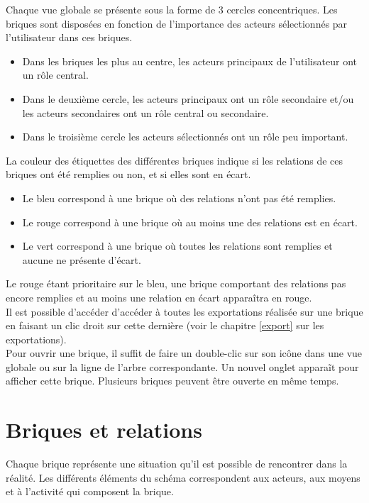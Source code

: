 Chaque vue globale se présente sous la forme de 3 cercles concentriques. Les briques sont disposées en fonction de l'importance des acteurs sélectionnés par l'utilisateur dans ces briques.
\begin{itemize}
\item Dans les briques les plus au centre, les acteurs principaux de l'utilisateur ont un rôle central.
\item Dans le deuxième cercle, les acteurs principaux ont un rôle secondaire et/ou les acteurs secondaires ont un rôle central ou secondaire.
\item Dans le troisième cercle les acteurs sélectionnés ont un rôle peu important.\\
\end{itemize}

La couleur des étiquettes des différentes briques indique si les relations de ces briques ont été remplies ou non, et si elles sont en écart. 
\begin{itemize}
\item Le bleu correspond à une brique où des relations n'ont pas été remplies.
\item Le rouge correspond à une brique où au moins une des relations est en écart.
\item Le vert correspond à une brique où toutes les relations sont remplies et aucune ne présente d'écart.
\end{itemize}

Le rouge étant prioritaire sur le bleu, une brique comportant des relations pas encore remplies et au moins une relation en écart apparaîtra en rouge.\\

Il est possible d'accéder d'accéder à toutes les exportations réalisée sur une brique en faisant un clic droit sur cette dernière (voir le chapitre \ref{export} sur les exportations).\\

Pour ouvrir une brique, il suffit de faire un double-clic sur son icône dans une vue globale ou sur la ligne de l'arbre correspondante. Un nouvel onglet apparaĩt  pour afficher cette brique. Plusieurs briques peuvent être ouverte en même temps. 

\section{Briques et relations}
Chaque brique représente une situation qu'il est possible de rencontrer dans la réalité. Les différents éléments du schéma correspondent aux acteurs, aux moyens et à l'activité qui composent la brique.\\

